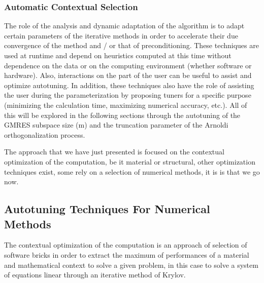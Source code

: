 \subsubsection{Automatic Contextual Selection}

The role of the analysis and dynamic adaptation of the algorithm is to adapt certain parameters of the iterative methods in order to accelerate their due convergence of the method and / or that of preconditioning. These techniques are used at runtime and depend on heuristics computed at this time without dependence on the data or on the computing environment (whether software or hardware). Also, interactions on the part of the user can be useful to assist and optimize autotuning. In addition, these techniques also have the role of assisting the user during the parameterization by proposing tuners for a specific purpose (minimizing the calculation time, maximizing numerical accuracy, etc.). All of this will be explored in the following sections through the autotuning of the GMRES subspace size (m) and the truncation parameter of the Arnoldi orthogonalization process.

The approach that we have just presented is focused on the contextual optimization of the computation, be it material or structural, other optimization techniques exist, some rely on a selection of numerical methods, it is is that we go now.

\iffalse
\subsection{Autotuning Techniques For Numerical Methods}

The contextual optimization of the computation is an approach of selection of software bricks in order to extract the maximum of performances of a material and mathematical context to solve a given problem, in this case to solve a system of equations linear through an iterative method of Krylov.

